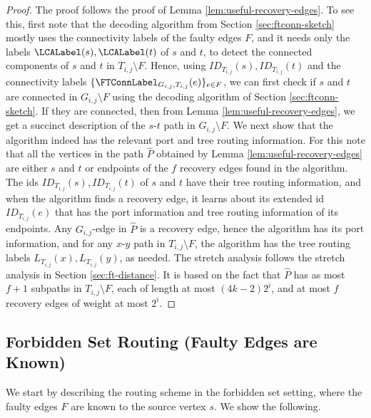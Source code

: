 \begin{proof}
The proof follows the proof of Lemma \ref{lem:useful-recovery-edges}. To see this, first note that the decoding algorithm from Section \ref{sec:ftconn-sketch} mostly uses the connectivity labels of the faulty edges $F$, and it needs only the labels $\LCALabel(s),\LCALabel(t)$ of $s$ and $t$, to detect the connected components of $s$ and $t$ in $T_{i,j} \setminus F$.  
Hence, using $ID_{T_{i,j}}(s),ID_{T_{i,j}}(t)$ and the connectivity labels $\{\FTConnLabel_{G_{i,j},T_{i,j}}(e)\}_{e \in F}$, we can first check if $s$ and $t$ are connected in $G_{i,j} \setminus F$ using the decoding algorithm of Section \ref{sec:ftconn-sketch}. If they are connected, then from Lemma \ref{lem:useful-recovery-edges}, we get a succinct description of the $s$-$t$ path in $G_{i,j} \setminus F$. We next show that the algorithm indeed has the relevant port and tree routing information. For this note that all the vertices in the path $\widehat{P}$ obtained by Lemma \ref{lem:useful-recovery-edges} are either $s$ and $t$ or endpoints of the $f$ recovery edges found in the algorithm. The ids $ID_{T_{i,j}}(s),ID_{T_{i,j}}(t)$ of $s$ and $t$ have their tree routing information, and when the algorithm finds a recovery edge, it learns about its extended id $ID_{T_{i,j}}(e)$ that has the port information and tree routing information of its endpoints. Any $G_{i,j}$-edge in $\widehat{P}$ is a recovery edge, hence the algorithm has its port information, and for any $x$-$y$ path in $T_{i,j} \setminus F$, the algorithm has the tree routing labels $L_{T_{i,j}}(x),L_{T_{i,j}}(y)$, as needed.
The stretch analysis follows the stretch analysis in Section \ref{sec:ft-distance}. It is based on the fact that $\widehat{P}$ has as most $f+1$ subpaths in $T_{i,j} \setminus F$, each of length at most $(4k-2)2^i$, and at most $f$ recovery edges of weight at most $2^i$.
\end{proof}







\subsection{Forbidden Set Routing (Faulty Edges are Known)}\label{sec:routing-known}
We start by describing the routing scheme in the forbidden set setting, where the faulty edges $F$ are known to the source vertex $s$. We show the following.


